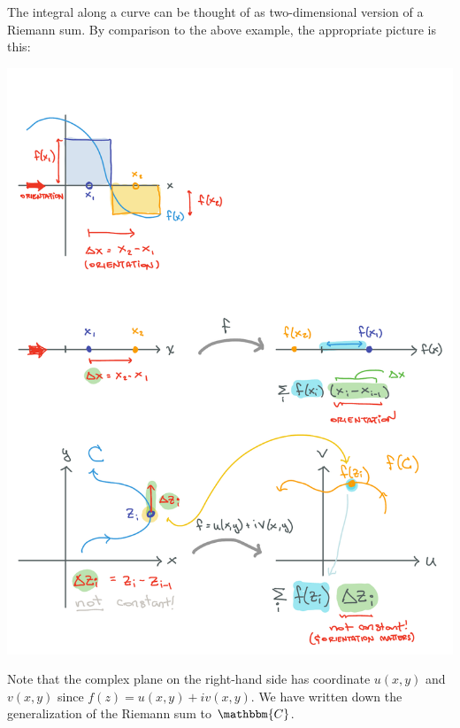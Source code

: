 The integral along a curve can be thought of as two-dimensional version of a Riemann sum. By comparison to the above example, the appropriate picture is this:
\begin{center}
\includegraphics[width=.7\textwidth]{figures/Complex_06_CRiem.pdf}
\end{center}
Note that the complex plane on the right-hand side has coordinate $u(x,y)$ and $v(x,y)$ since $f(z) = u(x,y) + i v(x,y)$. We have written down the generalization of the Riemann sum to $\mathbbm{C}$. 

